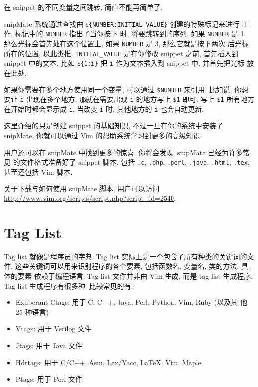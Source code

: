在 snippet 的不同变量之间跳转, 简直不能再简单了.

snipMate 系统通过查找由 \texttt{\$\{NUMBER:INITIAL\_VALUE\}} 创建的特殊标记来进行
工作. 标记中的 \texttt{NUMBER} 指出了当你按下  时, 将要跳转到的序列.
如果 \texttt{NUMBER} 是 1, 那么光标会首先处在这个位置上, 如果 \texttt{NUMBER} 
是 3, 那么它就是按下两次  后光标所在的位置, 以此类推.
\texttt{INITIAL\_VALUE} 是在你修改 snippet 之前, 首先插入到 snippet 中的文本.
比如 \texttt{\$\{1:i\}} 把 \texttt{i} 作为文本插入到 snippet 中, 并首先把光标
放在此处.

如果你需要在多个地方使用同一个变量, 可以通过 \texttt{\$NUMBER} 来引用. 比如说,
你想要让 \texttt{i} 出现在多个地方, 那就在需要出现 \texttt{i} 的地方写上
\texttt{\$1} 即可. 写上 \texttt{\$1} 所有地方在开始时都会显示成 \texttt{i},
当改变 \texttt{i} 时, 其他地方的 \texttt{i} 也会自动更新.

这里介绍的只是创建 snippet 的基础知识, 不过一旦在你的系统中安装了 snipMate,
你就可以通过 Vim 的帮助系统学习到更多的高级知识.

用户还可以在 snipMate 中找到更多的惊喜. 你将会发现, snipMate 已经为许多常见
的文件格式准备好了 snippet 脚本, 包括 \texttt{.c}, \texttt{.php},
\texttt{.perl}, \texttt{.java}, \texttt{.html}, \texttt{.tex}, 甚至还包括 Vim 
脚本.

\begin{warning}
    关于下载与如何使用 snipMate 脚本, 用户可以访问
    \url{http://www.vim.org/scripts/script.php?script_id=2540}.
\end{warning}

\section{Tag List}
\label{sec:using_tag_list}

Tag list 就像是程序员的字典. Tag list 实际上是一个包含了所有种类的关键词的文件,
这些关键词可以用来识别程序的各个要素, 包括函数名, 变量名, 类的方法, 具体的要素
依赖于编程语言. Tag list 文件并非由 Vim 生成, 而是 tag list 生成程序. Tag list
生成程序有很多种, 比较常见的有:
\begin{itemize}
    \item Exuberant Ctags: 用于 C, C++, Java, Perl, Python, Vim, Ruby (以及其
        他 25 种语言)
    \item Vtags: 用于 Verilog 文件
    \item Jtags: 用于 Java 文件
    \item Hdrtags: 用于 C/C++, Asm, Lex/Yacc, LaTeX, Vim, Maple
    \item Ptags: 用于 Perl 文件
\end{itemize}

